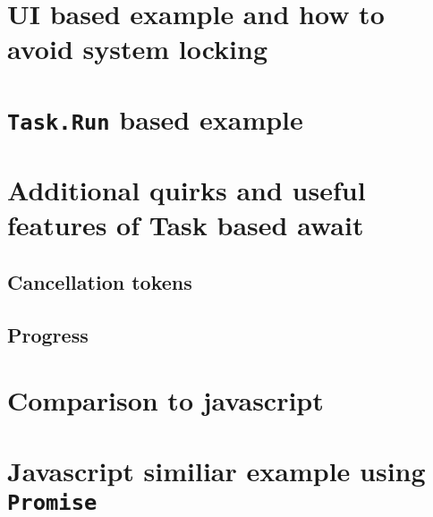 \documentclass{article}
\begin{document}
\section{UI based example and how to avoid system locking}

\section{\texttt{Task.Run} based example}


\section{Additional quirks and useful features of Task based await}
\subsection{Cancellation tokens}
\subsection{Progress}


\section{Comparison to javascript}

\section{Javascript similiar example using \texttt{Promise}}




\end{document}
